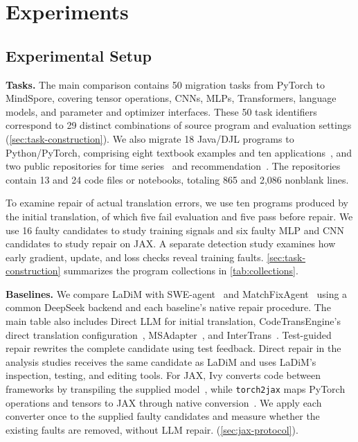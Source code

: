 \section{Experiments}

\subsection{Experimental Setup}
\label{sec:setup}

\textbf{Tasks.} The main comparison contains 50 migration tasks from PyTorch to MindSpore, covering tensor operations, CNNs, MLPs, Transformers, language models, and parameter and optimizer interfaces. These 50 task identifiers correspond to 29 distinct combinations of source program and evaluation settings (\cref{sec:task-construction}). We also migrate 18 Java/DJL programs to Python/PyTorch, comprising eight textbook examples and ten applications~\citep{djl2026,d2ljava2026}, and two public repositories for time series~\citep{jingles2026timeseries} and recommendation~\citep{chak2026twotower}. The repositories contain 13 and 24 code files or notebooks, totaling 865 and 2,086 nonblank lines.

To examine repair of actual translation errors, we use ten programs produced by the initial translation, of which five fail evaluation and five pass before repair. We use 16 faulty candidates to study training signals and six faulty MLP and CNN candidates to study repair on JAX. A separate detection study examines how early gradient, update, and loss checks reveal training faults. \cref{sec:task-construction} summarizes the program collections in \cref{tab:collections}.

\begin{table}[!t]
\caption{Migration acceptance and token use on common inputs: (a,b) individual programs, (c,d) repositories. Tokens are in millions. Calls count all LLM calls in (a,b) and investigation and repair calls in (c,d).}
\label{tab:main-results}
\centering
\small
\setlength{\tabcolsep}{3pt}

\end{table}

\textbf{Baselines.} We compare LaDiM with SWE-agent~\citep{yang2024sweagent} and MatchFixAgent~\citep{ibrahimzada2025matchfixagent} using a common DeepSeek backend and each baseline's native repair procedure. The main table also includes Direct LLM for initial translation, CodeTransEngine's direct translation configuration~\citep{macedo2025codetransengine}, MSAdapter~\citep{openi2025msadapter}, and InterTrans~\citep{macedo2024intertrans}. Test-guided repair rewrites the complete candidate using test feedback. Direct repair in the analysis studies receives the same candidate as LaDiM and uses LaDiM's inspection, testing, and editing tools. For JAX, Ivy converts code between frameworks by transpiling the supplied model~\citep{ivy2026transpiler}, while \texttt{torch2jax} maps PyTorch operations and tensors to JAX through native conversion~\citep{torch2jax2026}. We apply each converter once to the supplied faulty candidates and measure whether the existing faults are removed, without LLM repair. (\cref{sec:jax-protocol}).

